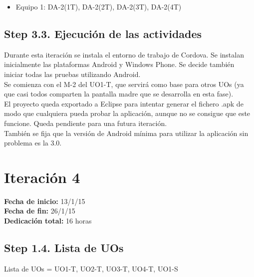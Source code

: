 \begin{itemize}
\item Equipo 1: DA-2(1T), DA-2(2T), DA-2(3T), DA-2(4T)
\end{itemize}

\subsection{Step 3.3. Ejecución de las actividades}
\label{it2:3.3}

Durante esta iteración se instala el entorno de trabajo de Cordova. Se instalan inicialmente las plataformas Android y Windows Phone. Se decide también iniciar todas las pruebas utilizando Android.\\

Se comienza con el M-2 del UO1-T, que servirá como base para otros UOs (ya que casi todos comparten la pantalla madre que se desarrolla en esta fase).\\

El proyecto queda exportado a Eclipse para intentar generar el fichero .apk de modo que cualquiera pueda probar la aplicación, aunque no se consigue que este funcione. Queda pendiente para una futura iteración.\\

También se fija que la versión de Android mínima para utilizar la aplicación sin problema es la 3.0.\\


\section{Iteración 4}
\label{it4}

\begin{flushleft}
\textbf{Fecha de inicio:} 13/1/15\\
\textbf{Fecha de fin:} 26/1/15\\
\textbf{Dedicación total:} 16 horas\\
\end{flushleft}

\subsection{Step 1.4. Lista de UOs}
\label{it4:1.4}

Lista de UOs = {UO1-T, UO2-T, UO3-T, UO4-T, UO1-S}

